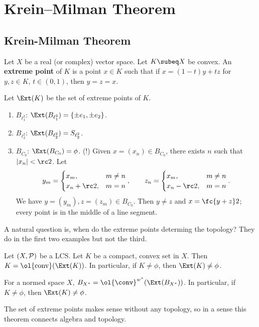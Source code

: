 \chapter{Krein--Milman Theorem}
\section{Krein-Milman Theorem}
\begin{df}
Let $X$ be a real (or complex) vector space. Let $K\subeq X$ be convex. An \textbf{extreme point} of $K$ is a point $x\in K$ such that if $x=(1-t)y+tz$ for $y,z\in K$, $t\in (0,1)$, then $y=z=x$.

Let $\Ext(K)$ be the set of extreme points of $K$.
\end{df} 

\begin{ex}
\begin{enumerate}
\item
$B_{\ell_1^2}$: $\Ext(B_{\ell_1^2})=\{\pm e_1,\pm e_2\}$.
\item
$B_{\ell_2^2}$: $\Ext(B_{\ell_2^2})=S_{\ell_2^2}$.
\item
$B_{C_0}$: $\Ext(B_{C_0})=\phi$. (!) Given $x=(x_n)\in B_{C_0}$, there exists $n$ such that $|x_n|<\rc2$. Let
\[
y_m=
\begin{cases}
x_m,&m\ne n\\
x_n+\rc 2,&m=n
\end{cases},
\qquad
z_n=
\begin{cases}
x_m,&m\ne n\\
x_n-\rc2,&m=n
\end{cases}.
\]
We have $y=(y_m),z=(z_m)\in B_{C_0}$. Then $y\ne z$ and $x=\fc{y+z}2$; every point is in the middle of a line segment.
\end{enumerate}
\end{ex}

A natural question is, when do the extreme points determing the topology? They do in the first two examples but not the third.

\begin{thm}
Let $(X,\cal P)$ be a LCS. Let $K$ be a compact, convex set in $X$. Then $K=\ol{\text{conv}}(\Ext(K))$. In particular, if $K\ne \phi$, then $\Ext(K)\ne \phi$.
\end{thm}
\begin{cor}
For a normed space $X$, $B_{X^*}=\ol{\conv}^{w^*}(\Ext(B_{X^*}))$. In particular, if $K\ne \phi$, then $\Ext(K)\ne \phi$.
\end{cor}
The set of extreme points makes sense without any topology, so in a sense this theorem connects algebra and topology.


